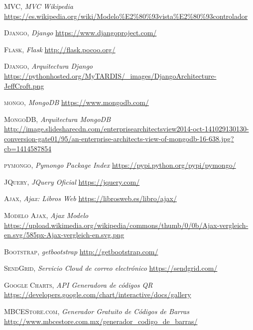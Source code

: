 \documentclass[a4paper,11pt]{book}
\begin{document}
\begin{thebibliography}{aaaa}
 \textsc{MVC},
\textit{MVC Wikipedia}
\url{https://es.wikipedia.org/wiki/Modelo%E2%80%93vista%E2%80%93controlador}






 \textsc{Django},
\textit{Django}
\url{https://www.djangoproject.com/}

 \textsc{Flask},
\textit{Flask}
\url{http://flask.pocoo.org/}

 \textsc{Django},
\textit{Arquitectura Django}
\url{https://pythonhosted.org/MyTARDIS/_images/DjangoArchitecture-JeffCroft.png}



 \textsc{mongo},
\textit{MongoDB}
\url{https://www.mongodb.com/}

 \textsc{MongoDB},
\textit{Arquitectura MongoDB}
\url{http://image.slidesharecdn.com/enterprisearchitectsview2014-oct-141029130130-conversion-gate01/95/an-enterprise-architects-view-of-mongodb-16-638.jpg?cb=1414587854}


 \textsc{pymongo},
\textit{Pymongo Package Index }
\url{https://pypi.python.org/pypi/pymongo/}



 \textsc{JQuery},
\textit{JQuery Oficial}
\url{https://jquery.com/}



 \textsc{Ajax},
\textit{Ajax: Libros Web}
\url{https://librosweb.es/libro/ajax/}

 \textsc{Modelo Ajax},
\textit{Ajax Modelo}
\url{https://upload.wikimedia.org/wikipedia/commons/thumb/0/0b/Ajax-vergleich-en.svg/585px-Ajax-vergleich-en.svg.png}



 \textsc{Bootstrap},
\textit{getbootstrap}
\url{http://getbootstrap.com/}




 \textsc{SendGrid},
\textit{Servicio Cloud de correo electrónico }
\url{https://sendgrid.com/}



 \textsc{Google Charts},
\textit{API Generadora de códigos QR }
\url{https://developers.google.com/chart/interactive/docs/gallery}

 \textsc{MBCEStore.com},
\textit{Generador Gratuito de Códigos de Barras }
\url{http://www.mbcestore.com.mx/generador_codigo_de_barras/}




\end{thebibliography}
\end{document}
